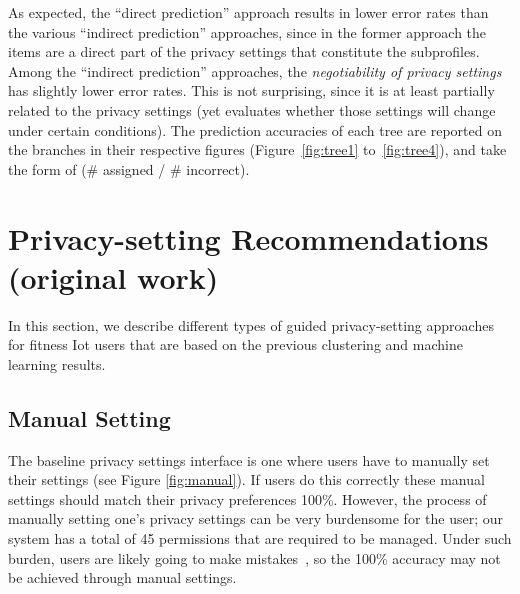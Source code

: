 As expected, the ``direct prediction'' approach results in lower error rates than the various ``indirect prediction'' approaches, since in the former approach the items are a direct part of the privacy settings that constitute the subprofiles. Among the ``indirect prediction'' approaches, the \textit{negotiability of privacy settings} has slightly lower error rates. This is not surprising, since it is at least partially related to the privacy settings (yet evaluates whether those settings will change under certain conditions). The prediction accuracies of each tree are reported on the branches in their respective figures (Figure~\ref{fig:tree1} to~\ref{fig:tree4}), and take the form of (\# assigned / \# incorrect). 

\section{Privacy-setting Recommendations (original work)}
In this section, we describe different types of guided privacy-setting approaches for fitness Iot users that are based on the previous clustering and machine learning results. 

\subsection{Manual Setting}
\label{sec:manual}

The baseline privacy settings interface is one where users have to manually set their settings (see Figure \ref{fig:manual}). If users do this correctly these manual settings should match their privacy preferences 100\%. However, the process of manually setting one's privacy settings can be very burdensome for the user; our system has a total of 45 permissions that are required to be managed. Under such burden, users are likely going to make mistakes~\cite{madejski2012study}, so the 100\% accuracy may not be achieved through manual settings.

